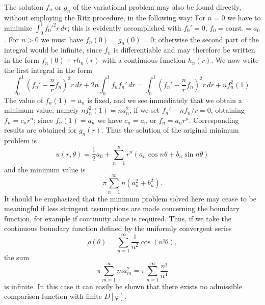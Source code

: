 The solution $f_n$ or $g_n$ of the variational problem may also be found directly, without employing the Ritz procedure, in the following way: For $n=0$ we have to minimize $\int_0^1 f_0'^2r\,dr$; this is evidently accomplished with $f_0'=0$, $f_0=\mathrm{const.}=a_0$. For $n>0$ we must have $f_n(0)=g_n(0)=0$; otherwise the second part of the integral would be infinite, since $f_n$ is differentiable and may therefore be written in the form $f_n(0)+rh_n(r)$ with a continuous function $h_n(r)$. We now write the first integral in the form
\[
\int_0^1\left(f_n'-\frac{n}{r}f_n\right)^2r\,dr+2n\int_0^1f_nf_n'\,dr
=\int_0^1\left(f_n'-\frac{n}{r}f_n\right)^2r\,dr+n f_n^2(1).
\]
The value of $f_n(1)=a_n$ is fixed, and we see immediately that we obtain a minimum value, namely $n f_n^2(1)=na_n^2$, if we set $f_n'-n f_n/r=0$, obtaining $f_n=c_nr^n$; since $f_n(1)=a_n$ we have $c_n=a_n$ or $f_n=a_nr^n$. Corresponding results are obtained for $g_n(r)$. Thus the solution of the original minimum problem is
\begin{equation}\tag{10}
u(r,\theta)=\frac12a_0+\sum_{n=1}^{\infty}r^n(a_n\cos n\theta+b_n\sin n\theta)
\end{equation}
and the minimum value is
\[
\pi\sum_{n=1}^{\infty}n(a_n^2+b_n^2).
\]
It should be emphasized that the minimum problem solved here may cease to be meaningful if less stringent assumptions are made
concerning the boundary function, for example if continuity alone is required. Thus, if we take the continuous boundary function defined by the uniformly convergent series
\[
\rho(\theta)=\sum_{n=1}^{\infty}\frac{1}{n^2}\cos(n!\theta),
\]
the sum
\[
\pi\sum_{m=1}^{\infty}m a_m^2
=\pi\sum_{n=1}^{\infty}\frac{n!}{n^4}
\]
is infinite. In this case it can easily be shown that there exists no admissible comparison function with finite $D[\varphi]$.

